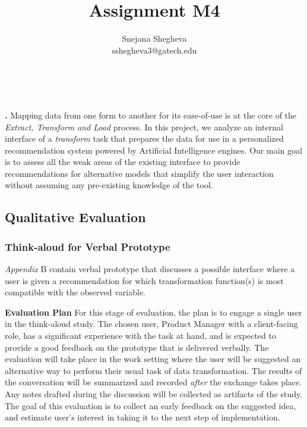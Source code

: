 \documentclass[12pt,letterpaper]{article}
\makeatletter
\renewcommand{\maketitle}{\bgroup
   \begin{center}
   \textbf{{\fontsize{18pt}{20}\selectfont \@title}}\\
   \vspace{10pt}
   {\fontsize{12pt}{0}\selectfont \@author} 
   \end{center}
}
\newenvironment{myquote}[1]%
  {\list{}{\leftmargin=#1\rightmargin=#1}\item[]}%
  {\endlist}
\renewenvironment{abstract}
{\vspace*{-.5in}\fontsize{12pt}{12}\begin{myquote}{.5in}
\noindent \par{\bfseries \abstractname.}}
{\medskip\noindent
\end{myquote}
}
\makeatother
\begin{document}
\title{Assignment M4}
\author{Snejana Shegheva \\ sshegheva3@gatech.edu}

\maketitle
\thispagestyle{fancy}

\begin{abstract}
Mapping data from one form to another for its ease-of-use is at the core of the \textit{Extract, Transform and Load} process. In this project, we analyze an internal interface of a \textit{transform} task that prepares the data for use in a personalized recommendation system powered by Artificial Intelligence engines. Our main goal is to assess all the weak areas of the existing interface to provide recommendations for alternative models that simplify the user interaction without assuming any pre-existing knowledge of the tool.
\end{abstract}

\subsection*{Qualitative Evaluation}
\subsubsection*{Think-aloud for Verbal Prototype}
\textit{Appendix} B contain verbal prototype that discusses a possible interface where a user is given a recommendation for which transformation function(s) is most compatible with the observed variable.

\textbf{Evaluation Plan}
For this stage of evaluation, the plan is to engage a single user in the think-aloud study. The chosen user, Product Manager with a client-facing role, has a significant experience with the task at hand, and is expected to provide a good feedback on the prototype that is delivered verbally. The evaluation will take place in the work setting where the user will be suggested an alternative way to perform their usual task of data transformation. The results of the conversation will be summarized and recorded \textit{after} the exchange takes place. Any notes drafted during the discussion will be collected as artifacts of the study. The goal of this evaluation is to collect an early feedback on the suggested idea, and estimate user's interest in taking it to the next step of implementation.
\end{document}
